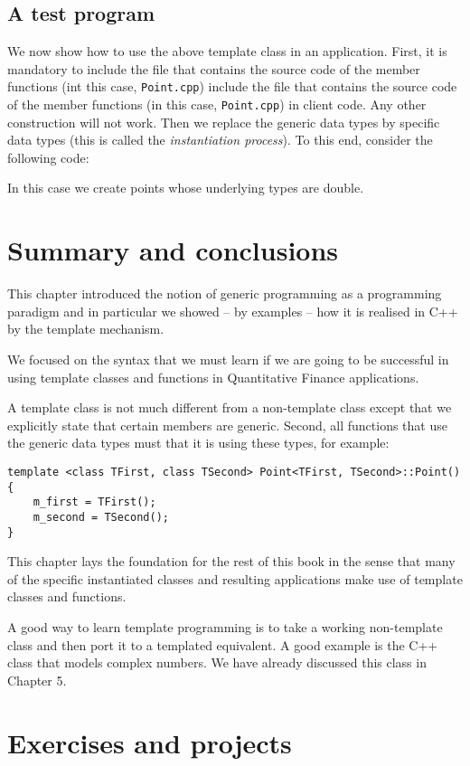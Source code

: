 


\subsection{A test program}
We now show how to use the above template class in an application. First, it is mandatory to include the file that contains the source code of the member functions (int this case, \texttt{Point.cpp}) include the file that contains the source code of the member functions (in this case, \texttt{Point.cpp}) in client code. Any other construction will not work. Then we replace the generic data types by specific data types (this is called the \emph{instantiation process}). To this end, consider the following code:



In this case we create points whose underlying types are double.

\section{Summary and conclusions}

This chapter introduced the notion of generic programming as a programming paradigm and in particular we showed -- by examples -- how it is realised in C++ by the template mechanism.

We focused on the syntax that we must learn if we are going to be successful in using template classes and functions in Quantitative Finance applications.


A template class is not much different from a non-template class except that we explicitly state that certain members are generic. Second, all functions that use the generic data types must that it is using these types, for example:

\begin{lstlisting}
template <class TFirst, class TSecond> Point<TFirst, TSecond>::Point()
{
	m_first = TFirst();
	m_second = TSecond();
}
\end{lstlisting}
This chapter lays the foundation for the rest of this book in the sense that many of the specific instantiated classes and resulting applications make use of template classes and functions.

A good way to learn template programming is to take a working non-template class and then port it to a templated equivalent. A good example is the C++ class that models complex numbers. We have already discussed this class in Chapter 5.

\section{Exercises and projects}

%